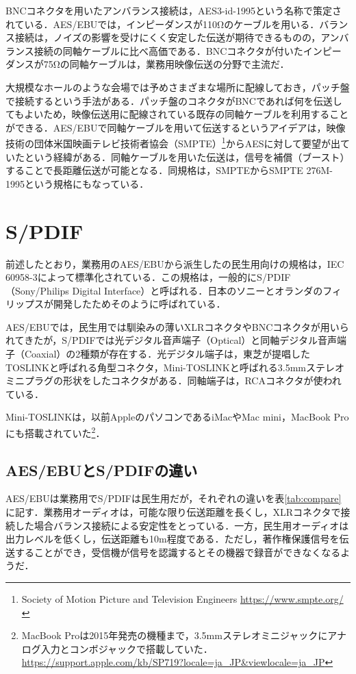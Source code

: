 BNCコネクタを用いたアンバランス接続は，AES3-id-1995という名称で策定されている．AES/EBUでは，インピーダンスが110Ωのケーブルを用いる．バランス接続は，ノイズの影響を受けにくく安定した伝送が期待できるものの，アンバランス接続の同軸ケーブルに比べ高価である．BNCコネクタが付いたインピーダンスが75Ωの同軸ケーブルは，業務用映像伝送の分野で主流だ．

大規模なホールのような会場では予めさまざまな場所に配線しておき，パッチ盤で接続するという手法がある．パッチ盤のコネクタがBNCであれば何を伝送してもよいため，映像伝送用に配線されている既存の同軸ケーブルを利用することができる．AES/EBUで同軸ケーブルを用いて伝送するというアイデアは，映像技術の団体米国映画テレビ技術者協会（SMPTE）\footnote{Society of Motion Picture and Television Engineers \url{https://www.smpte.org/}}からAESに対して要望が出ていたという経緯がある\cite{aes3id-1995-column}．同軸ケーブルを用いた伝送は，信号を補償（ブースト）することで長距離伝送が可能となる．同規格は，SMPTEからSMPTE 276M-1995という規格にもなっている．

\section{S/PDIF}

前述したとおり，業務用のAES/EBUから派生したの民生用向けの規格は，IEC 60958-3によって標準化されている．この規格は，一般的にS/PDIF（Sony/Philips Digital Interface）と呼ばれる．日本のソニーとオランダのフィリップスが開発したためそのように呼ばれている．

AES/EBUでは，民生用では馴染みの薄いXLRコネクタやBNCコネクタが用いられてきたが，S/PDIFでは光デジタル音声端子（Optical）と同軸デジタル音声端子（Coaxial）の2種類が存在する．光デジタル端子は，東芝が提唱したTOSLINKと呼ばれる角型コネクタ，Mini-TOSLINKと呼ばれる3.5mmステレオミニプラグの形状をしたコネクタがある．同軸端子は，RCAコネクタが使われている．

Mini-TOSLINKは，以前AppleのパソコンであるiMacやMac mini，MacBook Proにも搭載されていた\footnote{MacBook Proは2015年発売の機種まで，3.5mmステレオミニジャックにアナログ入力とコンボジャックで搭載していた． \url{https://support.apple.com/kb/SP719?locale=ja_JP&viewlocale=ja_JP}}．

\subsection{AES/EBUとS/PDIFの違い}

AES/EBUは業務用でS/PDIFは民生用だが，それぞれの違いを表\ref{tab:compare}に記す．業務用オーディオは，可能な限り伝送距離を長くし，XLRコネクタで接続した場合バランス接続による安定性をとっている．一方，民生用オーディオは出力レベルを低くし，伝送距離も10m程度である．ただし，著作権保護信号を伝送することができ，受信機が信号を認識するとその機器で録音ができなくなるようだ．

